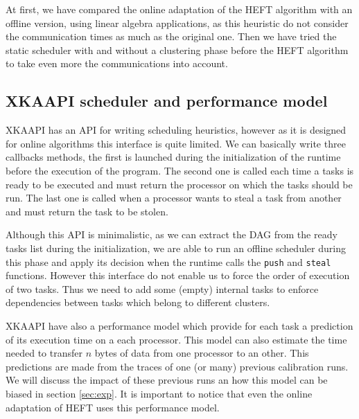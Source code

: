 \documentclass[10pt, conference, compsocconf,pdftex,dvipsnames]{IEEEtran}
\newcommand{\mytodo}[1]{\todo[inline]{#1}}
\begin{document}
At first, we have compared the online adaptation of the HEFT algorithm with an
offline version, using linear algebra applications, as this heuristic do not
consider the communication times as much as the original one.  Then we have
tried the static scheduler with and without a clustering phase before the HEFT
algorithm to take even more the communications into account. 

\subsection{XKAAPI scheduler and performance model}
\label{sec:impl-kaapi}

XKAAPI has an API for writing scheduling heuristics, however as it is designed
for online algorithms this interface is quite limited. We can basically write
three callbacks methods, the first is launched during the initialization of
the runtime before the execution of the program. The second one is called each
time a tasks is ready to be executed and must return the processor on which
the tasks should be run. The last one is called when a processor wants to
steal a task from another and must return the task to be stolen.

Although this API is minimalistic, as we can extract the DAG from the ready
tasks list during the initialization, we are able to run an offline scheduler
during this phase and apply its decision when the runtime calls the
\texttt{push} and \texttt{steal} functions. However this interface do not
enable us to force the order of execution of two tasks. Thus we need to add
some (empty) internal tasks to enforce dependencies between tasks which belong
to different clusters.

XKAAPI have also a performance model which provide for each task a prediction
of its execution time on a each processor. This model can also estimate the 
time needed to transfer $n$ bytes of data from one processor to an other. This
predictions are made from the traces of one (or many) previous calibration
runs. We will discuss the impact of these previous runs an how this model can
be biased in section \ref{sec:exp}. It is important to notice that even the
online adaptation of HEFT uses this performance model.

\mytodo{Continue here}
\end{document}

